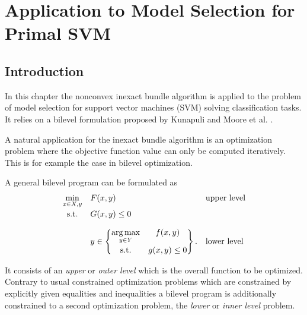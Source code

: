 \section{Application to Model Selection for Primal SVM}

\subsection{Introduction}

In this chapter the nonconvex inexact bundle algorithm is applied to the problem of model selection for support vector machines (SVM) solving classification tasks.
It relies on a bilevel formulation proposed by Kunapuli \cite{Kunapuli2008} and Moore et al. \cite{Moore2011}.

A natural application for the inexact bundle algorithm is an optimization problem where the objective function value can only be computed iteratively. This is for example the case in bilevel optimization.

A general bilevel program can be formulated as \cite{Kunapuli2008}
\begin{equation}
	\begin{array}{cll}
	\displaystyle\min_{x \in X, y} & F(x,y) & \text{upper level} \vspace{0.5ex}\\
	\text{s.t.} & G(x,y) \leq 0 & \vspace{1em}\\
	& y \in \begin{Bmatrix} \displaystyle\argmax_{y\in Y} & f(x,y) \vspace{0.5ex}\\
	                        \text{s.t.} & g(x,y) \leq 0 
													\end{Bmatrix}. & \text{lower level}
	\end{array}
\end{equation}

It consists of an \emph{upper} or \emph{outer level} which is the overall function to be optimized. Contrary to usual constrained optimization problems which are constrained by explicitly given equalities and inequalities a  bilevel program is additionally constrained to a second optimization problem, the \emph{lower} or \emph{inner level} problem.

